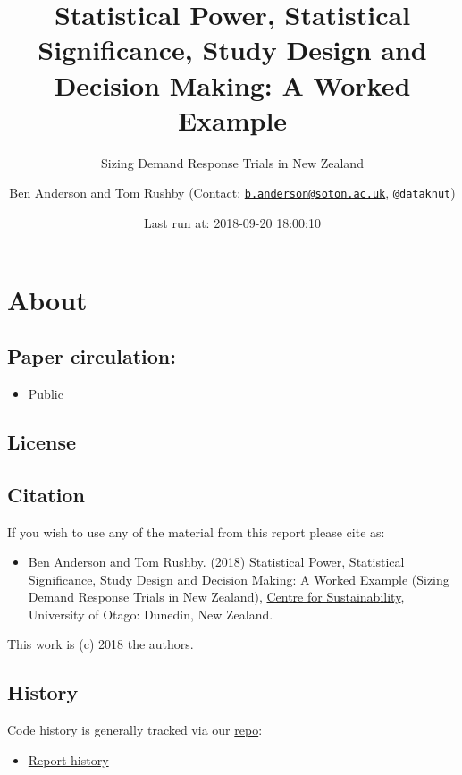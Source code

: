 \documentclass[]{article}
\title{Statistical Power, Statistical Significance, Study Design and Decision
Making: A Worked Example}
\subtitle{Sizing Demand Response Trials in New Zealand}
\author{Ben Anderson and Tom Rushby (Contact:
\href{mailto:b.anderson@soton.ac.uk}{\nolinkurl{b.anderson@soton.ac.uk}},
\texttt{@dataknut})}
\date{Last run at: 2018-09-20 18:00:10}
\providecommand{\tightlist}{%
  \setlength{\itemsep}{0pt}\setlength{\parskip}{0pt}}
\theoremstyle{definition}
\theoremstyle{definition}
\theoremstyle{definition}
\theoremstyle{remark}
\begin{document}
\maketitle

{
\setcounter{tocdepth}{2}
\tableofcontents
}
\newpage

\section{About}\label{about}

\subsection{Paper circulation:}\label{paper-circulation}

\begin{itemize}
\tightlist
\item
  Public
\end{itemize}

\subsection{License}\label{license}

\subsection{Citation}\label{citation}

If you wish to use any of the material from this report please cite as:

\begin{itemize}
\tightlist
\item
  Ben Anderson and Tom Rushby. (2018) Statistical Power, Statistical
  Significance, Study Design and Decision Making: A Worked Example
  (Sizing Demand Response Trials in New Zealand),
  \href{http://www.otago.ac.nz/centre-sustainability/}{Centre for
  Sustainability}, University of Otago: Dunedin, New Zealand.
\end{itemize}

This work is (c) 2018 the authors.

\subsection{History}\label{history}

Code history is generally tracked via our
\href{https://github.com/CfSOtago/GREENGrid}{repo}:

\begin{itemize}
\tightlist
\item
  \href{https://github.com/CfSOtago/GREENGrid/commits/master/analysis/powerAnalysis}{Report
  history}
\end{itemize}
\end{document}
